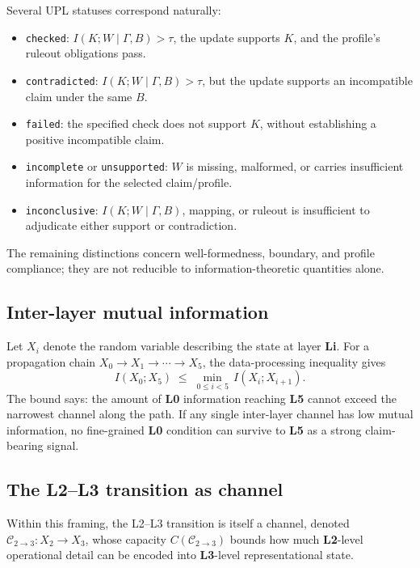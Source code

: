 \documentclass[11pt, a4paper]{article}
\theoremstyle{upldef}
\newcommand{\layer}[1]{\textbf{L#1}}
\newcommand{\statuslabel}[1]{\texttt{\small #1}}
\begin{document}
Several UPL statuses correspond naturally:
\begin{itemize}
\item \statuslabel{checked}: $I(K;W \mid \Gamma,B) > \tau$, the
update supports $K$, and the profile's ruleout obligations pass.
\item \statuslabel{contradicted}: $I(K;W \mid \Gamma,B) > \tau$, but
the update supports an incompatible claim under the same $B$.
\item \statuslabel{failed}: the specified check does not support $K$,
without establishing a positive incompatible claim.
\item \statuslabel{incomplete} or \statuslabel{unsupported}: $W$ is
missing, malformed, or carries insufficient information for the
selected claim/profile.
\item \statuslabel{inconclusive}: $I(K;W \mid \Gamma,B)$, mapping,
or ruleout is insufficient to adjudicate either support or
contradiction.
\end{itemize}
The remaining distinctions concern well-formedness, boundary, and
profile compliance; they are not reducible to information-theoretic
quantities alone.

\subsection{Inter-layer mutual information}

Let $X_i$ denote the random variable describing the state at layer
\layer{i}. For a propagation chain
$X_0 \to X_1 \to \cdots \to X_5$, the data-processing inequality
\citep{cover2006} gives
\begin{equation}
I(X_0; X_5)
\;\leq\;
\min_{0 \leq i < 5}\, I(X_i; X_{i+1}).
\label{eq:dpi}
\end{equation}
The bound says: the amount of \layer{0} information reaching
\layer{5} cannot exceed the narrowest channel along the path. If
any single inter-layer channel has low mutual information, no
fine-grained \layer{0} condition can survive to \layer{5} as a
strong claim-bearing signal.

\subsection{The L2--L3 transition as channel}

Within this framing, the L2--L3 transition is itself a channel,
denoted $\mathcal{C}_{2\to 3}: X_2 \to X_3$, whose capacity
$C(\mathcal{C}_{2\to 3})$ bounds how much \layer{2}-level
operational detail can be encoded into \layer{3}-level
representational state.
\end{document}
